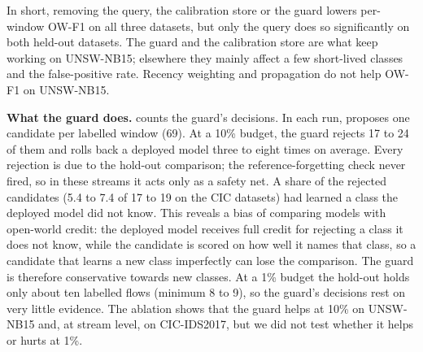 In short, removing the query, the calibration store or the guard lowers per-window OW-F1 on all three datasets,
but only the query does so significantly on both held-out datasets. The guard and the calibration store are what
keep \nova{} working on UNSW-NB15; elsewhere they mainly affect a few short-lived classes and the false-positive
rate. Recency weighting and propagation do not help OW-F1 on UNSW-NB15.

\textbf{What the guard does.}  counts the guard's decisions. In each run, \nova{} proposes one
candidate per labelled window (69). At a 10\% budget, the guard rejects 17 to 24 of them and rolls back a deployed
model three to eight times on average. Every rejection is due to the hold-out comparison; the reference-forgetting
check never fired, so in these streams it acts only as a safety net. A share of the rejected candidates (5.4 to 7.4
of 17 to 19 on the CIC datasets) had learned a class the deployed model did not know. This reveals a bias of comparing models
with open-world credit: the deployed model receives full credit for rejecting a class it does not know, while the
candidate is scored on how well it names that class, so a candidate that learns a new class imperfectly can lose
the comparison. The guard is therefore conservative towards new classes. At a 1\% budget the hold-out holds only
about ten labelled flows (minimum 8 to 9), so the guard's decisions rest on very little evidence. The ablation
shows that the guard helps at 10\% on UNSW-NB15 and, at stream level, on CIC-IDS2017, but we did not test whether
it helps or hurts at 1\%.

\begin{table}[t]
\centering
\caption{Deployment-guard decisions per \nova{} run (mean over five seeds; 69 candidates per run).}
\label{tab:guard}
\small
\setlength{\tabcolsep}{3pt}
\end{table}


